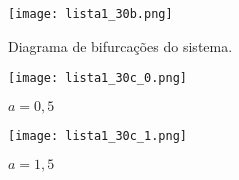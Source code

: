 \documentclass[a4paper]{report}
\begin{document}

\begin{figure}[H]
    \centering
    \texttt{[image: lista1\_30b.png]}
    \caption{Diagrama de bifurcações do sistema.}
    \label{fig:lista1_30b-png}
\end{figure}


\begin{figure}[H]
    \centering
    \texttt{[image: lista1\_30c\_0.png]}
    \caption{$a=0,5$}
    \label{fig:lista1_30c_0-png}
\end{figure}

\begin{figure}[H]
    \centering
    \texttt{[image: lista1\_30c\_1.png]}
    \caption{$a=1,5$}
    \label{fig:lista1_30c_0-png}
\end{figure}
\end{document}
